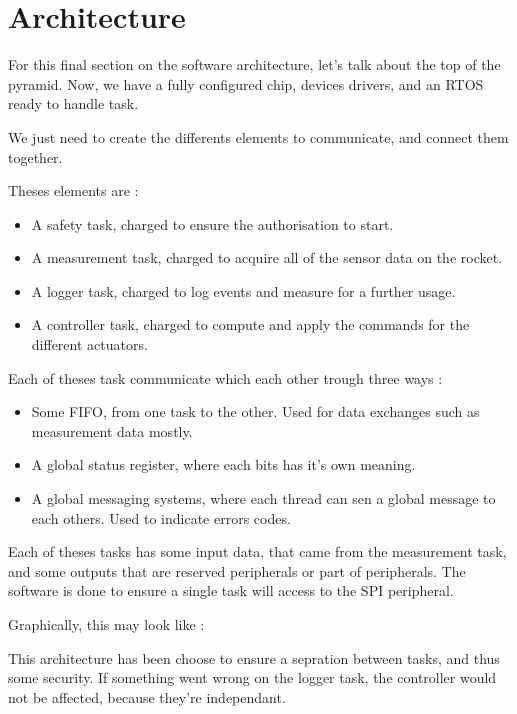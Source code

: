\section{Architecture}
For this final section on the software architecture, let's talk about the top of the pyramid.
Now, we have a fully configured chip, devices drivers, and an RTOS ready to handle task.

We just need to create the differents elements to communicate, and connect them together.

Theses elements are :

\begin{itemize}[noitemsep]
    \item   A safety task, charged to ensure the authorisation to start.
    \item   A measurement task, charged to acquire all of the sensor data on the rocket.
    \item   A logger task, charged to log events and measure for a further usage.
    \item   A controller task, charged to compute and apply the commands for the different actuators.
\end{itemize}

Each of theses task communicate which each other trough three ways :

\begin{itemize}[noitemsep]
    \item   Some FIFO, from one task to the other. Used for data exchanges such as measurement data mostly.
    \item   A global status register, where each bits has it's own meaning.
    \item   A global messaging systems, where each thread can sen a global message to each others. Used to indicate errors codes.
\end{itemize}

Each of theses tasks has some input data, that came from the measurement task, and some outputs that are
reserved peripherals or part of peripherals. The software is done to ensure a single task will access to the SPI peripheral.

Graphically, this may look like :



This architecture has been choose to ensure a sepration between tasks, and thus some security. If something went wrong on the logger
task, the controller would not be affected, because they're independant.

